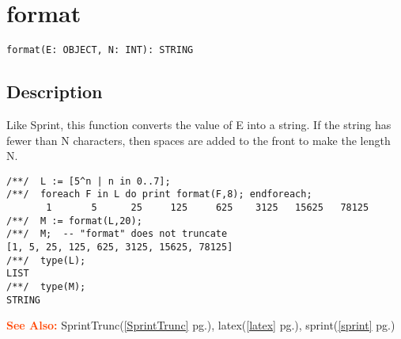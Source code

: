 \documentclass[a4paper]{mybook}
\newenvironment{command}{}{} %
\newcommand\SeeAlso{\par\textcolor{OrangeRed}{\textbf{\large See Also: }}}
\begin{document}
\section{format}
\label{format}
\begin{command} %


\begin{Verbatim}[label=syntax, rulecolor=\color{MidnightBlue},
frame=single]
format(E: OBJECT, N: INT): STRING
\end{Verbatim}


\subsection*{Description}

Like Sprint, this function converts the value of E into a string.  If
the string has fewer than N characters, then spaces are added to the
front to make the length N.
\begin{Verbatim}[label=example, rulecolor=\color{PineGreen}, frame=single]
/**/  L := [5^n | n in 0..7];
/**/  foreach F in L do print format(F,8); endforeach;
       1       5      25     125     625    3125   15625   78125
/**/  M := format(L,20);
/**/  M;  -- "format" does not truncate
[1, 5, 25, 125, 625, 3125, 15625, 78125]
/**/  type(L);
LIST
/**/  type(M);
STRING
\end{Verbatim}


\SeeAlso %
  SprintTrunc(\ref{SprintTrunc} pg.\pageref{SprintTrunc}), 
    latex(\ref{latex} pg.\pageref{latex}), 
    sprint(\ref{sprint} pg.\pageref{sprint})
\end{command} %
\end{document}
